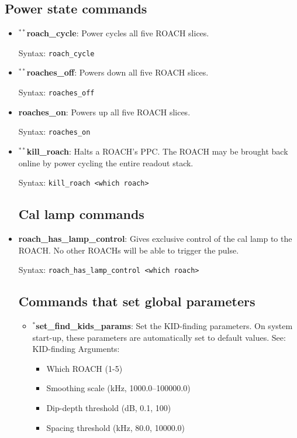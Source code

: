 \subsection{Power state commands}
\begin{itemize}[leftmargin=*,label={}]

\item $^{**}$\textbf{roach\_cycle}: Power cycles all five ROACH slices.

Syntax: \texttt{roach\_cycle}

\item $^{**}$\textbf{roaches\_off}: Powers down all five ROACH slices.

Syntax: \texttt{roaches\_off}

\item \textbf{roaches\_on}: Powers up all five ROACH slices.

Syntax: \texttt{roaches\_on}

\item $^{**}$\textbf{kill\_roach}: Halts a ROACH’s PPC. The ROACH may be brought back online by power cycling the entire readout stack.

Syntax: \texttt{kill\_roach <which roach>}

\subsection{Cal lamp commands}

\item \textbf{roach\_has\_lamp\_control}: Gives exclusive control of the cal lamp to the ROACH. No other ROACHs will be able to trigger the pulse.

Syntax: \texttt{roach\_has\_lamp\_control <which roach>}

\subsection{Commands that set global parameters}
\begin{itemize}[leftmargin=*,label={}]

\item $^{*}$\textbf{set\_find\_kids\_params}: Set the KID-finding parameters. On system start-up, these parameters are automatically set to default values. See: KID-finding
Arguments:
\begin{itemize}
  \item Which ROACH (1-5)
  \item Smoothing scale (kHz, 1000.0--100000.0)
  \item Dip-depth threshold (dB, 0.1, 100)
  \item Spacing threshold (kHz, 80.0, 10000.0)
\end{itemize}


\end{itemize}
\end{itemize}
